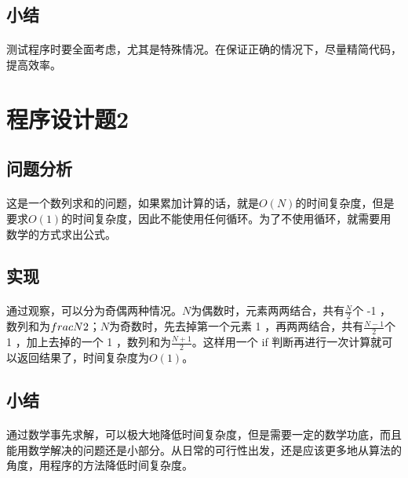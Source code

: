 \documentclass[UTF-8, 12pt]{ctexart}
\begin{document}
    \subsection{小结}
    \paragraph{}
    测试程序时要全面考虑，尤其是特殊情况。在保证正确的情况下，尽量精简代码，提高效率。

\section{程序设计题2}
    \subsection{问题分析}
    \paragraph{}
    这是一个数列求和的问题，如果累加计算的话，就是$O(N)$的时间复杂度，但是要求$O(1)$的时间复杂度，因此不能使用任何循环。为了不使用循环，就需要用数学的方式求出公式。

    \subsection{实现}
    \paragraph{}
    通过观察，可以分为奇偶两种情况。$N$为偶数时，元素两两结合，共有$\frac{N}{2}$个 -1 ，数列和为$\-frac{N}{2}$；$N$为奇数时，先去掉第一个元素 1 ，再两两结合，共有$\frac{N-1}{2}$个 1 ，加上去掉的一个 1 ，数列和为$\frac{N+1}{2}$。这样用一个 if 判断再进行一次计算就可以返回结果了，时间复杂度为$O(1)$。
    
    \subsection{小结}
    \paragraph{}
    通过数学事先求解，可以极大地降低时间复杂度，但是需要一定的数学功底，而且能用数学解决的问题还是小部分。从日常的可行性出发，还是应该更多地从算法的角度，用程序的方法降低时间复杂度。
\end{document}
